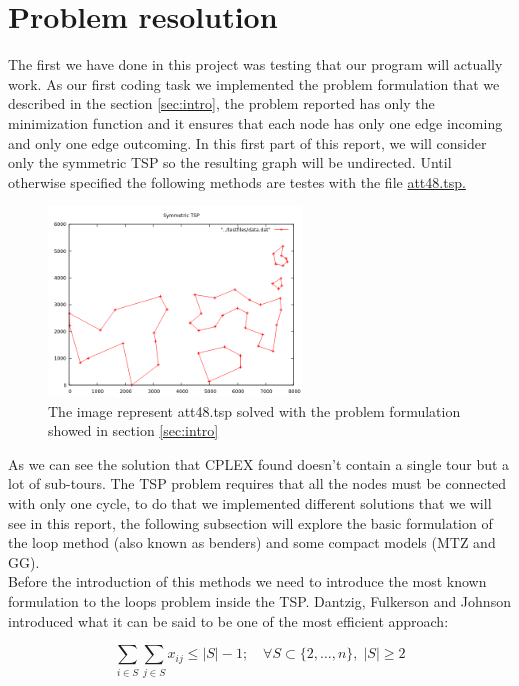 \section{Problem resolution}
\label{sec:problem-resolution}
The first we have done in this project was testing that our program will actually work. As our first coding task we implemented the problem formulation that we described in the section \ref{sec:intro}, the problem reported has only the minimization function and it ensures that each node has only one edge incoming and only one edge outcoming. In this first part of this report, we will consider only the symmetric TSP so the resulting graph will be undirected. Until otherwise specified the following methods are testes with the file \href{http://comopt.ifi.uni-heidelberg.de/software/TSPLIB95/tsp/}{att48.tsp.}

\begin{figure}[h]
	\centering
	\includegraphics[width=0.6\textwidth]{images/symmetric_with_tours}
	\caption{The image represent att48.tsp solved with the problem formulation showed in section \ref{sec:intro}}
\end{figure}

As we can see the solution that CPLEX found doesn't contain a single tour but a lot of sub-tours. The TSP problem requires that all the nodes must be connected with only one cycle, to do that we implemented different solutions that we will see in this report, the following subsection will explore the basic formulation of the loop method (also known as benders) and some compact models (MTZ and GG).\\
Before the introduction of this methods we need to introduce the most known formulation to the loops problem inside the TSP. Dantzig, Fulkerson and Johnson \cite{dantzig} introduced what it can be said to be one of the most efficient approach:

\begin{equation}
	\sum_{i\in S}\sum_{j \in S}x_{ij}\le |S|-1; \quad \forall S \subset\{2, \dots, n\}, \; |S|\ge 2
\end{equation}

